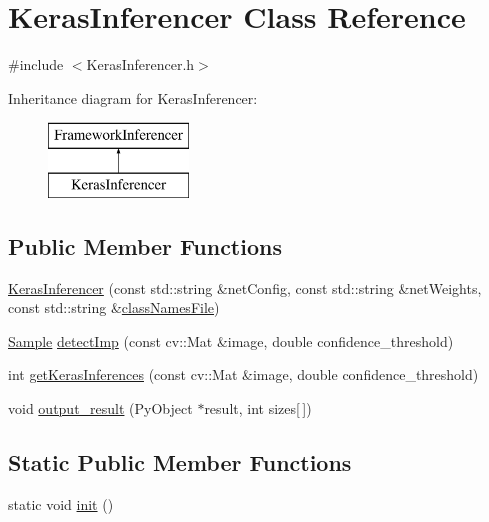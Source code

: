 \hypertarget{class_keras_inferencer}{}\section{Keras\+Inferencer Class Reference}
\label{class_keras_inferencer}


{\ttfamily \#include $<$Keras\+Inferencer.\+h$>$}

Inheritance diagram for Keras\+Inferencer\+:\begin{figure}[H]
\begin{center}
\leavevmode
\includegraphics[height=2.000000cm]{class_keras_inferencer}
\end{center}
\end{figure}
\subsection*{Public Member Functions}
\begin{DoxyCompactItemize}
\item 
\hyperlink{class_keras_inferencer_a086ecb2ca8beafba15acdfca0e3ede00}{Keras\+Inferencer} (const std\+::string \&net\+Config, const std\+::string \&net\+Weights, const std\+::string \&\hyperlink{class_framework_inferencer_abdb304d43262f48e0438a55778c7540f}{class\+Names\+File})
\item 
\hyperlink{struct_sample}{Sample} \hyperlink{class_keras_inferencer_a4c944e963e3ec3ca8fa0bd4b229a8931}{detect\+Imp} (const cv\+::\+Mat \&image, double confidence\+\_\+threshold)
\item 
int \hyperlink{class_keras_inferencer_adb1b0ad044dd344be3d12df018db589c}{get\+Keras\+Inferences} (const cv\+::\+Mat \&image, double confidence\+\_\+threshold)
\item 
void \hyperlink{class_keras_inferencer_a954532264ddadbee70c7c4bdb7b55ed3}{output\+\_\+result} (Py\+Object $\ast$result, int sizes\mbox{[}$\,$\mbox{]})
\end{DoxyCompactItemize}
\subsection*{Static Public Member Functions}
\begin{DoxyCompactItemize}
\item 
static void \hyperlink{class_keras_inferencer_a98f3d1bdf1e3207e44602312c04c6e98}{init} ()
\end{DoxyCompactItemize}
